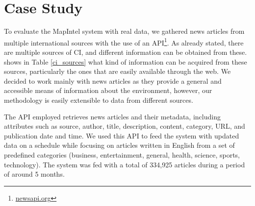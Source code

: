 \documentclass[a4paper]{article}
\begin{document}
\section{Case Study}
To evaluate the MapIntel system with real data, we gathered news articles from multiple international sources with the use of an API\footnote{\href{https://newsapi.org/}{newsapi.org}}. As already stated, there are multiple sources of CI, and different information can be obtained from these. \citet{dey2011} shows in Table \ref{ci_sources} what kind of information can be acquired from these sources, particularly the ones that are easily available through the web. We decided to work mainly with news articles as they provide a general and accessible means of information about the environment, however, our methodology is easily extensible to data from different sources. 

\begin{table}[H]
  \centering
  \caption{Competitive intelligence resources on the web - \citet{dey2011}}
  \label{ci_sources}
\end{table}

The API employed retrieves news articles and their metadata, including attributes such as source, author, title, description, content, category, URL, and publication date and time. We used this API to feed the system with updated data on a schedule while focusing on articles written in English from a set of predefined categories (business, entertainment, general, health, science, sports, technology). The system was fed with a total of 334,925 articles during a period of around 5 months.
\end{document}

